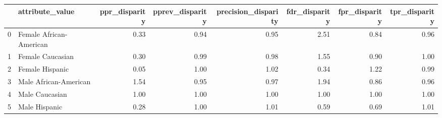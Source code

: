 \begin{tabular}{llrrrrrr}
\toprule
{} &          attribute\_value &  ppr\_disparity &  pprev\_disparity &  precision\_disparity &  fdr\_disparity &  fpr\_disparity &  tpr\_disparity \\
\midrule
0 &  Female African-American &           0.33 &             0.94 &                 0.95 &           2.51 &           0.84 &           0.96 \\
1 &         Female Caucasian &           0.30 &             0.99 &                 0.98 &           1.55 &           0.90 &           1.00 \\
2 &          Female Hispanic &           0.05 &             1.00 &                 1.02 &           0.34 &           1.22 &           0.99 \\
3 &    Male African-American &           1.54 &             0.95 &                 0.97 &           1.94 &           0.86 &           0.96 \\
4 &           Male Caucasian &           1.00 &             1.00 &                 1.00 &           1.00 &           1.00 &           1.00 \\
5 &            Male Hispanic &           0.28 &             1.00 &                 1.01 &           0.59 &           0.69 &           1.01 \\
\bottomrule
\end{tabular}

